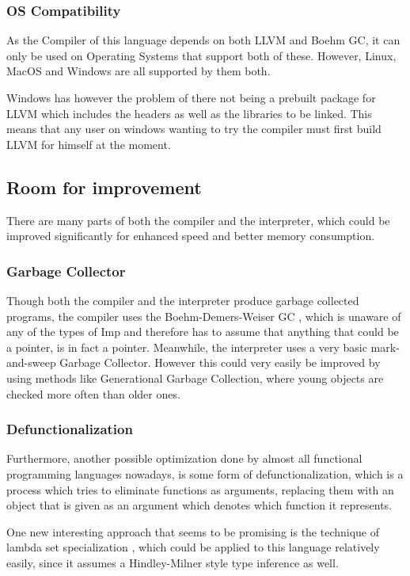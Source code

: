\documentclass[12pt]{article}
\begin{document}
\subsubsection{OS Compatibility}
As the Compiler of this language depends on both
LLVM and Boehm GC, it can only be used on Operating Systems
that support both of these. However, Linux, MacOS and Windows
are all supported by them both.

Windows has however the problem of there not being
a prebuilt package for LLVM which includes the headers as well
as the libraries to be linked. This means that any
user on windows wanting to try the compiler
must first build LLVM for himself at the moment.

\subsection{Room for improvement}
There are many parts of both the compiler and the
interpreter, which could be improved significantly
for enhanced speed and better memory consumption.

\subsubsection{Garbage Collector}
Though both the compiler and the interpreter produce
garbage collected programs, the compiler uses the
Boehm-Demers-Weiser GC \autocite{GarbageCollector},
which is unaware of any of the types of Imp and therefore
has to assume that anything that could be a pointer,
is in fact a pointer.
Meanwhile, the interpreter uses a very basic mark-and-sweep
Garbage Collector. However this could very easily be improved
by using methods like Generational Garbage Collection, where
young objects are checked more often than older ones.

\subsubsection{Defunctionalization}
Furthermore, another possible optimization done by almost all
functional programming languages nowadays, is some form of
defunctionalization, which is a process which tries
to eliminate functions as arguments, replacing them with
an object that is given as an argument which denotes which
function it represents.

One new interesting approach that seems to be promising
is the technique of lambda set specialization
\autocite{brandonBetterDefunctionalizationLambda2023a}, which
could be applied to this language relatively easily,
since it assumes a Hindley-Milner style type inference
as well.
\end{document}
